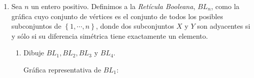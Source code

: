 \documentclass{article}
\newcommand{\set}[1]{%
  \left\{ #1 \right\}%
}
\begin{document}
\begin{enumerate}
\begin{proof}
\begin{itemize}
      Sabemos que las entradas de cada columna de $M_{1}$ son igual a 1,
      que son las flechas $e_{j}$ con un vértice llamado \textit{cabeza de la flecha}.
      Por otro lado, las entradas del \textit{i-ésimo} renglón de $M_{1}$
      suman $d^{-}(v_{i})$, ya que las entradas corresponden a todas las
      flechas de las cuales $v_{i}$ es cabeza de dicha flecha. 
      
      Entonces, tenemos que:
      \begin{equation*}
        \begin{split}
          \abs{A_{D}} & = \sum_{j=1}^{\abs{A}} \sum_{i=1}^{\abs{V}} M^{-}_{ij} \\
          & = \sum_{i=1}^{\abs{V}} \sum_{j=1}^{\abs{A}} M^{-}_{ij} \\
          & = \sum_{i=1}^{\abs{V}} d^{-}(v_{i}) \\
          & = \sum_{v \in V} d^{-}(v)
        \end{split}
      \end{equation*}
    \end{itemize}
    Por lo tanto, queda demostrado que:
    \[
    \displaystyle \sum_{v \in V_D} d^+(v) = \sum_{v \in V_D} d^-(v) = |A_D|
    \]
  \end{proof}

\item  Sea $n$ un entero positivo. Definimos a la {\em Ret\'icula Booleana},
  $BL_n$, como la gr\'afica cuyo conjunto de vértices es el conjunto de todos
  los posibles subconjuntos de $\set{1, \cdots, n}$, donde dos subconjuntos
  $X$ y $Y$ son adyacentes si y s\'olo si su diferencia sim\'etrica tiene
  exactamente un elemento.
  
  \begin{enumerate}
  \item Dibuje $BL_1, BL_2, BL_3$ y $BL_4$.
    
    Gráfica representativa de $BL_1$:
    \begin{center}
    \end{center}
    

\end{enumerate}
\end{enumerate}
\end{document}
